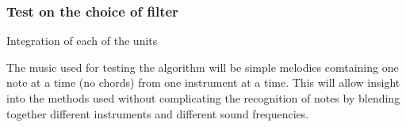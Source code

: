\subsubsection{Test on the choice of filter}
\text
{}

Integration of each of the units 





The music used for testing the algorithm will be simple melodies comtaining one note at a time (no chords) from one instrument at a time. This will allow insight into the methods used without complicating the recognition of notes by blending together different instruments and different sound frequencies.\\\\

